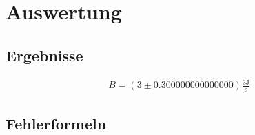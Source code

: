 \documentclass[a4paper,10pt]{scrbook}
\begin{document}
\section*{Auswertung}

\subsection*{Ergebnisse}

\begin{align*}B= (3\pm 0.300000000000000)\mathrm{\frac{3 J}{s}}\end{align*}

\subsection*{Fehlerformeln}
\end{document}
